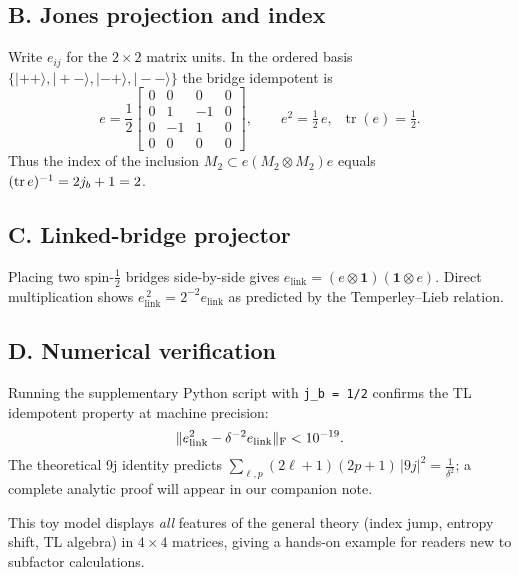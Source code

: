 \documentclass[11pt]{article}
\begin{document}
\subsection*{B. Jones projection and index}

Write $e_{ij}$ for the $2\times2$ matrix units.
In the ordered basis
$\{|+\!+\rangle,|+-\rangle,|-+\rangle,|--\rangle\}$ the
bridge idempotent is
\[
  e=\frac12
  \begin{bmatrix}
    0&0&0&0\\
    0&1&-1&0\\
    0&-1&1&0\\
    0&0&0&0
  \end{bmatrix},
  \qquad
  e^2=\tfrac12\,e,\;\;
  \operatorname{tr}(e)=\tfrac12.
\]
Thus the index of the inclusion
$M_2\subset e(M_2\otimes M_2)e$ equals $({\rm tr}\,e)^{-1}=2j_b+1=2$.

\subsection*{C. Linked-bridge projector}

Placing two spin-$\tfrac12$ bridges side-by-side gives
\(
  e_{\mathrm{link}}=(e\otimes\mathbf1)(\mathbf1\otimes e)
\).
Direct multiplication shows
$e_{\mathrm{link}}^{\,2}=2^{-2}e_{\mathrm{link}}$ as predicted by the
Temperley–Lieb relation.

\subsection*{D. Numerical verification}

Running the supplementary Python script with \texttt{j\_b = 1/2} confirms
the TL idempotent property at machine precision:
\[
  \|e_{\mathrm{link}}^{2}-\delta^{-2}e_{\mathrm{link}}\|_{\rm F} < 10^{-19}.
\]
The theoretical 9j identity predicts
$\sum_{\ell,p}(2\ell\!+\!1)(2p\!+\!1)\,|9j|^{2} = \tfrac{1}{\delta^{2}}$;
a complete analytic proof will appear in our companion note.


\medskip
This toy model displays \emph{all} features of the general theory
(index jump, entropy shift, TL algebra) in $4\times4$ matrices, giving a
hands-on example for readers new to subfactor calculations.
\end{document}
